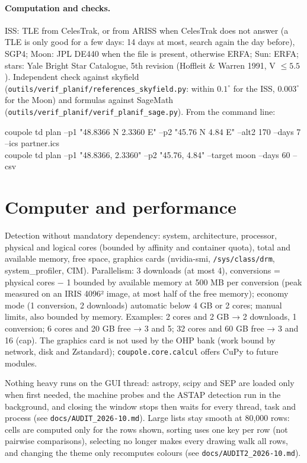 \paragraph{Computation and checks.} ISS: TLE from CelesTrak, or from ARISS when CelesTrak does not answer (a TLE is
only good for a few days: 14 days at most, search again the day before), SGP4; Moon: JPL DE440 when the file is
present, otherwise ERFA; Sun: ERFA; stars: Yale Bright Star Catalogue, 5th revision (Hoffleit \& Warren 1991,
V $\le 5.5$). Independent check against skyfield (\texttt{outils/verif\_planif/references\_skyfield.py}: within
$0.1^\circ$ for the ISS, $0.003^\circ$ for the Moon) and formulas against SageMath
(\texttt{outils/verif\_planif/verif\_planif\_sage.py}). From the command line:
\begin{ccode}
coupole td plan --p1 "48.8366 N 2.3360 E" --p2 "45.76 N 4.84 E" --alt2 170 --days 7 --ics partner.ics\\
coupole td plan --p1 "48.8366, 2.3360" --p2 "45.76, 4.84" --target moon --days 60 --csv
\end{ccode}


\section{Computer and performance}
Detection without mandatory dependency: system, architecture, processor, physical and logical cores (bounded by
affinity and container quota), total and available memory, free space, graphics cards (nvidia-smi,
\texttt{/sys/class/drm}, system\_profiler, CIM). Parallelism: 3 downloads (at most 4), conversions = physical
cores − 1 bounded by available memory at 500 MB per conversion (peak measured on an IRIS 4096² image, at most half
of the free memory); economy mode (1 conversion, 2 downloads) automatic below 4 GB or 2 cores; manual limits, also
bounded by memory. Examples: 2 cores and 2 GB → 2 downloads, 1 conversion; 6 cores and 20 GB free → 3 and 5;
32 cores and 60 GB free → 3 and 16 (cap). The graphics card is not used by the OHP bank (work bound by network, disk
and Zstandard); \texttt{coupole.core.calcul} offers CuPy to future modules.

Nothing heavy runs on the GUI thread: astropy, scipy and SEP are loaded only when first needed, the machine probes and
the ASTAP detection run in the background, and closing the window stops then waits for every thread, task and process
(see \texttt{docs/AUDIT\_2026-10.md}). Large lists stay smooth at 80,000 rows: cells are computed only for the rows
shown, sorting uses one key per row (not pairwise comparisons), selecting no longer makes every drawing walk all rows,
and changing the theme only recomputes colours (see \texttt{docs/AUDIT2\_2026-10.md}).

